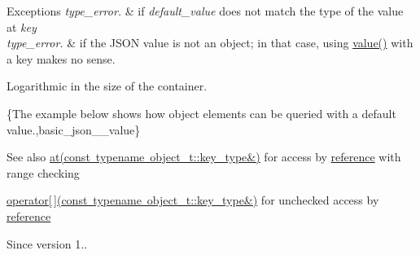 \begin{DoxyExceptions}{Exceptions}
{\em type\+\_\+error.} & if {\itshape default\+\_\+value} does not match the type of the value at {\itshape key} \\
\hline
{\em type\+\_\+error.} & if the J\+S\+ON value is not an object; in that case, using {\ttfamily \mbox{\hyperlink{classnlohmann_1_1basic__json_adcf8ca5079f5db993820bf50036bf45d}{value()}}} with a key makes no sense.\\
\hline
\end{DoxyExceptions}
Logarithmic in the size of the container.

\{The example below shows how object elements can be queried with a default value.,basic\+\_\+json\+\_\+\+\_\+value\}

\begin{DoxySeeAlso}{See also}
\mbox{\hyperlink{classnlohmann_1_1basic__json_a93403e803947b86f4da2d1fb3345cf2c}{at(const typename object\+\_\+t\+::key\+\_\+type\&)}} for access by \mbox{\hyperlink{classnlohmann_1_1basic__json_ac6a5eddd156c776ac75ff54cfe54a5bc}{reference}} with range checking 

\mbox{\hyperlink{classnlohmann_1_1basic__json_a233b02b0839ef798942dd46157cc0fe6}{operator\mbox{[}$\,$\mbox{]}(const typename object\+\_\+t\+::key\+\_\+type\&)}} for unchecked access by \mbox{\hyperlink{classnlohmann_1_1basic__json_ac6a5eddd156c776ac75ff54cfe54a5bc}{reference}}
\end{DoxySeeAlso}
\begin{DoxySince}{Since}
version 1.. 
\end{DoxySince}
\mbox{\label{classnlohmann_1_1basic__json_a671aea68432ecb28770bbc482918f023}} 

